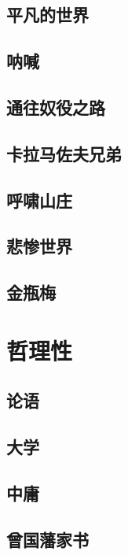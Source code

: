\documentclass[UTF8,a4paper,12pt]{ctexbook}
\begin{document}
	\section{平凡的世界}
		
	\section{呐喊}
	
	\section{通往奴役之路}
	
	\section{卡拉马佐夫兄弟}
	
	\section{呼啸山庄}
	
	\section{悲惨世界}
	
	\section{金瓶梅}
	
\chapter{哲理性}
	\section{论语}

	\section{大学}
	
	\section{中庸}
	
	\section{曾国藩家书}
	
\end{document}
